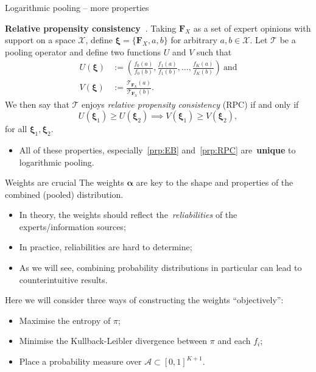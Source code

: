 \begin{frame}{Logarithmic pooling -- more properties}
\begin{property}
\label{prp:RPC}
\textbf{Relative propensity consistency~\citep{genest1984}}.
Taking $\boldsymbol F_{X}$ as a set of expert opinions with support on a space $\mathcal{X}$, define $\boldsymbol \xi = \{\boldsymbol F_{X}, a, b\}$ for arbitrary $a , b \in \mathcal{X}$.
Let $\mathcal{T}$ be a pooling operator and define two functions $U$ and $V$ such that 
\begin{align}
 U(\boldsymbol \xi) &:= \left( \frac{f_0(a)}{f_0(b)}, \frac{f_1(a)}{f_1(b)}, \ldots, \frac{f_K(a)}{f_K(b)} \right)\:\text{and}\\
 V(\boldsymbol \xi) & := \frac{\mathcal{T}_{\boldsymbol F_{X}} (a)}{\mathcal{T}_{\boldsymbol F_{X}} (b)}.
\end{align}
We then say that $\mathcal{T}$ enjoys \textit{relative propensity consistency} (RPC) if and only if
\begin{equation}
 U(\boldsymbol \xi_1) \geq U(\boldsymbol \xi_2) \implies  V(\boldsymbol \xi_1) \geq V(\boldsymbol \xi_2),
\end{equation}
for all $\boldsymbol \xi_1, \boldsymbol \xi_2$.
\end{property}

\begin{itemize}
 \item All of these properties, especially~\ref{prp:EB} and~\ref{prp:RPC} are~\textbf{unique} to logarithmic pooling.
\end{itemize}
\end{frame}
\begin{frame}{Weights are crucial}
The weights $\boldsymbol\alpha$ are key to the shape and properties of the combined (pooled) distribution.
\begin{itemize}
 \item In theory, the weights should reflect the~\textit{reliabilities} of the experts/information sources;\pause
 \item In practice, reliabilities are hard to determine;\pause
 \item As we will see, combining probability distributions in particular can lead to counterintuitive results.\pause
\end{itemize}
Here we will consider three ways of constructing the weights ``objectively'': 
\begin{itemize}[label=]
 \item Maximise the entropy of $\pi$;\pause
 \item Minimise the Kullback-Leibler divergence between $\pi$ and each $f_i$;\pause
 \item Place a probability measure over $\mathcal{A} \subset [0, 1]^{K + 1}$.
\end{itemize}
 \end{frame}
